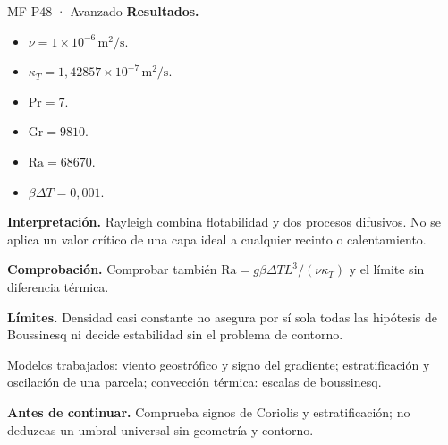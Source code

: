 \begin{studiumworked}{MF-P48 · Avanzado}
\textbf{Resultados.}\begin{itemize}

\item $\nu=1\times10^{-6}\,\mathrm{m^2/s}$.

\item $\kappa_T=1{,}42857\times10^{-7}\,\mathrm{m^2/s}$.

\item $\mathrm{Pr}=7$.

\item $\mathrm{Gr}=9810$.

\item $\mathrm{Ra}=68670$.

\item $\beta\Delta T=0{,}001$.

\end{itemize}

\textbf{Interpretación.} Rayleigh combina flotabilidad y dos procesos difusivos. No se aplica un valor crítico de una capa ideal a cualquier recinto o calentamiento.

\textbf{Comprobación.} Comprobar también $\mathrm{Ra}=g\beta\Delta TL^3/(\nu\kappa_T)$ y el límite sin diferencia térmica.

\textbf{Límites.} Densidad casi constante no asegura por sí sola todas las hipótesis de Boussinesq ni decide estabilidad sin el problema de contorno.

\end{studiumworked}



\begin{tcolorbox}[studiumcheck,breakable=false,title={Síntesis y comprobación}]Modelos trabajados: viento geostrófico y signo del gradiente; estratificación y oscilación de una parcela; convección térmica: escalas de boussinesq.\par\textbf{Antes de continuar.} Comprueba signos de Coriolis y estratificación; no deduzcas un umbral universal sin geometría y contorno.\end{tcolorbox}
